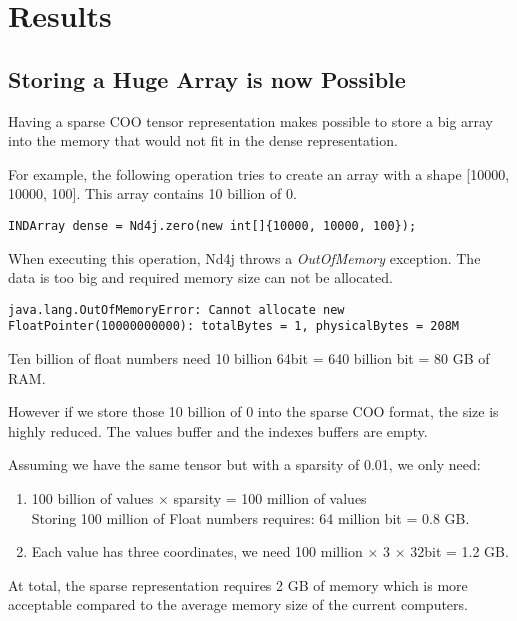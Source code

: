 \chapter{Results}

\section{Storing a Huge Array is now Possible}

Having a sparse COO tensor representation makes possible to store a big array into the memory that would not fit in the dense representation.

For example, the following operation tries to create an array with a shape [10000, 10000, 100]. This array contains 10 billion of 0.

\begin{lstlisting}[style=nonumbers]
	INDArray dense = Nd4j.zero(new int[]{10000, 10000, 100});
\end{lstlisting}

When executing this operation, Nd4j throws a \textit{OutOfMemory} exception. The data is too big and required memory size can not be allocated.
\begin{lstlisting}[style=nonumbers]
	java.lang.OutOfMemoryError: Cannot allocate new FloatPointer(10000000000): totalBytes = 1, physicalBytes = 208M
\end{lstlisting}

Ten billion of float numbers need 10 billion \time 64bit = 640 billion bit = 80 GB of RAM.

However if we store those 10 billion of 0 into the sparse COO format, the size is highly reduced. The values buffer and the indexes buffers are empty. 

Assuming we have the same tensor but with a sparsity of 0.01, we only need:
\begin{enumerate}
	\item 100 billion of values $\times$ sparsity = 100 million of values\\
	Storing 100 million of Float numbers requires: 64 million bit = 0.8 GB.\\
	\item Each value has three coordinates, we need 100 million $\times$ 3 $\times$ 32bit = 1.2 GB.
		
\end{enumerate}
	At total, the sparse representation requires 2 GB of memory which is more acceptable compared to the average memory size of the current computers.
	
	


